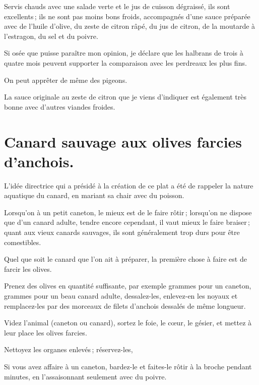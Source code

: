 Servis chauds avec une salade verte et le jus de cuisson dégraissé, ils sont
excellents ; ils ne sont pas moins bons froids, accompagnés d'une sauce
préparée avec de l'huile d'olive, du zeste de citron râpé, du jus de citron, de
la moutarde à l'estragon, du sel et du poivre.

Si osée que puisse paraître mon opinion, je déclare que les halbrans de trois
à quatre mois peuvent supporter la comparaison avec les perdreaux les plus fins.

\sk

On peut apprêter de même des pigeons.

\sk

La sauce originale au zeste de citron que je viens d'indiquer est également
très bonne avec d'autres viandes froides.

\section*{\centering Canard sauvage aux olives farcies d’anchois.}
{}

L'idée directrice qui a présidé à la création de ce plat a été de rappeler la
nature aquatique du canard, en mariant sa chair avec du poisson.

Lorsqu'on à un petit caneton, le mieux est de le faire rôtir ; lorsqu'on ne
dispose que d'un canard adulte, tendre encore cependant, il vaut mieux le faire
braiser ; quant aux vieux canards sauvages, ils sont généralement trop durs
pour être comestibles.

Quel que soit le canard que l'on ait à préparer, la première chose à faire est
de farcir les olives.

Prenez des olives en quantité suffisante, par exemple {\mmm} grammes
pour un caneton, {\mmm} grammes pour un beau canard adulte, dessalez-les,
enlevez-en les noyaux et remplacez-les par des morceaux de filets d'anchois
dessalés de même longueur.

Videz l'animal (caneton ou canard), sortez le foie, le cœur, le gésier, et
mettez à leur place les olives farcies.

Nettoyez les organes enlevés ; réservez-les,

\sk

Si vous avez affaire à un caneton, bardez-le et faites-le rôtir à la broche
pendant {\mmm} minutes, en l'assaisonnant seulement avec du poivre.

